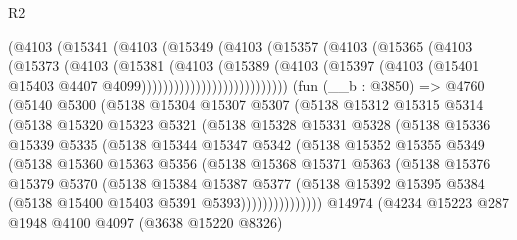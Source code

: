 \begin{lexlean}{R2}
\begin{coremodule}
                      (@4103
                        (@15341
                          (@4103
                            (@15349
                              (@4103
                                (@15357
                                  (@4103
                                    (@15365
                                      (@4103
                                        (@15373
                                          (@4103
                                            (@15381
                                              (@4103
                                                (@15389
                                                  (@4103
                                                    (@15397
                                                      (@4103
                                                        (@15401
                                                          @15403
                                                          @4407
                                                          @4099)))))))))))))))))))))))))))
    (fun (__b : @3850) =>
    @4760
      (@5140
        @5300
        (@5138
          @15304
          @15307
          @5307
          (@5138
            @15312
            @15315
            @5314
            (@5138
              @15320
              @15323
              @5321
              (@5138
                @15328
                @15331
                @5328
                (@5138
                  @15336
                  @15339
                  @5335
                  (@5138
                    @15344
                    @15347
                    @5342
                    (@5138
                      @15352
                      @15355
                      @5349
                      (@5138
                        @15360
                        @15363
                        @5356
                        (@5138
                          @15368
                          @15371
                          @5363
                          (@5138
                            @15376
                            @15379
                            @5370
                            (@5138
                              @15384
                              @15387
                              @5377
                              (@5138
                                @15392
                                @15395
                                @5384
                                (@5138 @15400 @15403 @5391 @5393)))))))))))))))
    @14974
    (@4234
      @15223
      @287
      @1948
      @4100
      @4097
      (@3638 @15220 @8326)

\end{coremodule}
\end{lexlean}
